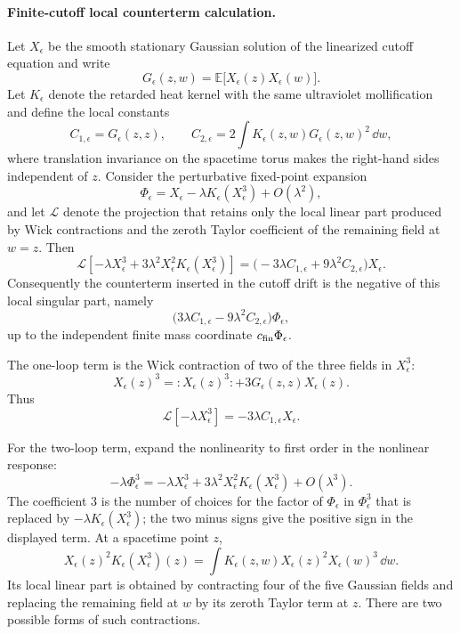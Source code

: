 \paragraph{Finite-cutoff local counterterm calculation.}
\label{par:spde-phi-four-three-local-counterterm-calculation}
Let \(X_\epsilon\) be the smooth stationary Gaussian solution of the
linearized cutoff equation and write
\[
  G_\epsilon(z,w)
  =
  \mathbb E\bigl[X_\epsilon(z)X_\epsilon(w)\bigr].
\]
Let \(K_\epsilon\) denote the retarded heat kernel with the same ultraviolet
mollification and define the local constants
\begin{equation}
  C_{1,\epsilon}=G_\epsilon(z,z),
  \qquad
  C_{2,\epsilon}
  =
  2\int K_\epsilon(z,w)G_\epsilon(z,w)^2\,\dd w ,
  \label{eq:spde-c1-c2-local-definitions}
\end{equation}
where translation invariance on the spacetime torus makes the right-hand
sides independent of \(z\).  Consider the perturbative fixed-point expansion
\[
  \Phi_\epsilon
  =
  X_\epsilon
  -
  \lambda K_\epsilon(X_\epsilon^3)
  +O(\lambda^2),
\]
and let \(\mathcal L\) denote the projection that retains only the local
linear part produced by Wick contractions and the zeroth Taylor coefficient
of the remaining field at \(w=z\).  Then
\[
  \mathcal L\!\left[-\lambda X_\epsilon^3
  +3\lambda^2X_\epsilon^2K_\epsilon(X_\epsilon^3)\right]
  =
  \bigl(-3\lambda C_{1,\epsilon}
        +9\lambda^2C_{2,\epsilon}\bigr)X_\epsilon .
\]
Consequently the counterterm inserted in the cutoff drift is the negative of
this local singular part, namely
\[
  \bigl(3\lambda C_{1,\epsilon}
        -9\lambda^2C_{2,\epsilon}\bigr)\Phi_\epsilon ,
\]
up to the independent finite mass coordinate \(c_{\rm fin}\Phi_\epsilon\).

The one-loop term is the Wick contraction of two of the three fields in
\(X_\epsilon^3\):
\[
  X_\epsilon(z)^3
  =
  :\!X_\epsilon(z)^3\!:
  +3G_\epsilon(z,z)X_\epsilon(z).
\]
Thus
\[
  \mathcal L[-\lambda X_\epsilon^3]
  =
  -3\lambda C_{1,\epsilon}X_\epsilon .
\]

For the two-loop term, expand the nonlinearity to first order in the
nonlinear response:
\[
  -\lambda\Phi_\epsilon^3
  =
  -\lambda X_\epsilon^3
  +3\lambda^2X_\epsilon^2K_\epsilon(X_\epsilon^3)
  +O(\lambda^3).
\]
The coefficient \(3\) is the number of choices for the factor of
\(\Phi_\epsilon\) in \(\Phi_\epsilon^3\) that is replaced by
\(-\lambda K_\epsilon(X_\epsilon^3)\); the two minus signs give the positive
sign in the displayed term.  At a spacetime point \(z\),
\[
  X_\epsilon(z)^2K_\epsilon(X_\epsilon^3)(z)
  =
  \int K_\epsilon(z,w)
  X_\epsilon(z)^2X_\epsilon(w)^3\,\dd w .
\]
Its local linear part is obtained by contracting four of the five Gaussian
fields and replacing the remaining field at \(w\) by its zeroth Taylor term
at \(z\).  There are two possible forms of such contractions.

